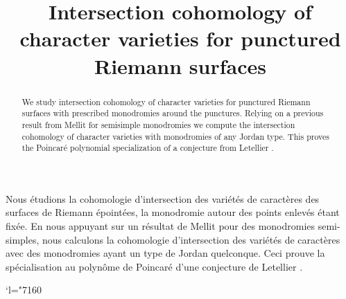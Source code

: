 \documentclass[JEP,XML,SOM,NoEqCountersInSection,Unicode,published]{cedram}
\newcommand{\Changel}{\mathcode`l="7160}
\theoremstyle{definition}
\theoremstyle{plain}
\begin{document}
\frontmatter
\title{Intersection cohomology of character varieties for punctured Riemann surfaces}

\author[\initial{M.} \lastname{Ballandras}]{ }
\address{ICMAT, Campus Cantoblanco, UAM\\
C/ Nicolás Cabrera, 13-15, 28049 Madrid, Spain}

\begin{abstract}
We study intersection cohomology of character varieties for punctured Riemann surfaces with prescribed monodromies around the punctures. Relying on a previous result from Mellit \cite{Mellit2020} for semisimple monodromies we compute the intersection cohomology of character varieties with monodromies of any Jordan type. This proves the Poincaré polynomial specialization of a conjecture from Letellier \cite{Letellier13}.
\end{abstract}





\begin{altabstract}
Nous étudions la cohomologie d'intersection des variétés de caractères des surfaces de Riemann épointées, la monodromie autour des points enlevés étant fixée. En nous appuyant sur un résultat de Mellit \cite{Mellit2020} pour des monodromies semi-simples, nous calculons la cohomologie d'intersection des variétés de caractères avec des monodromies ayant un type de Jordan quelconque. Ceci prouve la spécialisation au polynôme de Poincaré d'une conjecture de Letellier \cite{Letellier13}.
\end{altabstract}
\maketitle
\vspace*{-1.5\baselineskip}\enlargethispage{.5\baselineskip}
\tableofcontents
\mainmatter
\vspace*{-3\baselineskip}\mbox{}
\Changel
\end{document}
